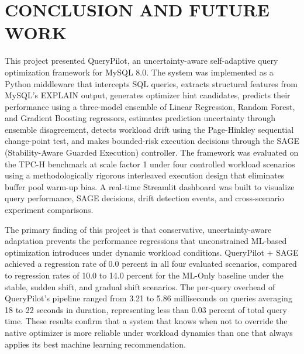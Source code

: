 
\chapter{CONCLUSION AND FUTURE WORK}
\label{chap:conclusion}

This project presented QueryPilot, an uncertainty-aware self-adaptive query
optimization framework for MySQL 8.0. The system was implemented as a Python
middleware that intercepts SQL queries, extracts structural features from
MySQL's EXPLAIN output, generates optimizer hint candidates, predicts their
performance using a three-model ensemble of Linear Regression, Random Forest,
and Gradient Boosting regressors, estimates prediction uncertainty through
ensemble disagreement, detects workload drift using the Page-Hinkley
sequential change-point test, and makes bounded-risk execution decisions
through the SAGE (Stability-Aware Guarded Execution) controller. The framework
was evaluated on the TPC-H benchmark at scale factor 1 under four controlled
workload scenarios using a methodologically rigorous interleaved execution
design that eliminates buffer pool warm-up bias. A real-time Streamlit
dashboard was built to visualize query performance, SAGE decisions, drift
detection events, and cross-scenario experiment comparisons.

The primary finding of this project is that conservative, uncertainty-aware
adaptation prevents the performance regressions that unconstrained ML-based
optimization introduces under dynamic workload conditions. QueryPilot + SAGE
achieved a regression rate of 0.0 percent in all four evaluated scenarios,
compared to regression rates of 10.0 to 14.0 percent for the ML-Only baseline
under the stable, sudden shift, and gradual shift scenarios. The per-query
overhead of QueryPilot's pipeline ranged from 3.21 to 5.86 milliseconds on
queries averaging 18 to 22 seconds in duration, representing less than 0.03
percent of total query time. These results confirm that a system that knows
when not to override the native optimizer is more reliable under workload
dynamics than one that always applies its best machine learning recommendation.

